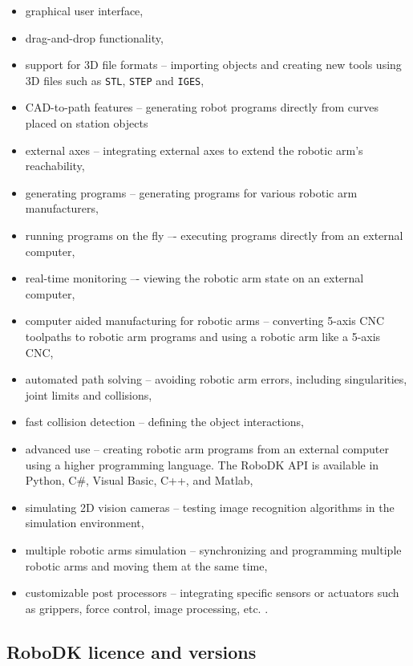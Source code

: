 \begin{itemize}
\item graphical user interface,
\item drag-and-drop functionality, 
\item support for 3D file formats -- importing objects and creating new tools using 3D files such as \texttt{STL}, \texttt{STEP} and \texttt{IGES},
\item CAD-to-path features -- generating robot programs directly from curves placed on station objects 
\item external axes -- integrating external axes to extend the robotic arm’s reachability,
\item generating programs -- generating programs for various robotic arm manufacturers,
\item running programs on the fly –- executing programs directly from an external computer,
\item real-time monitoring –- viewing the robotic arm state on an external computer,
\item computer aided manufacturing for robotic arms -- converting 5-axis CNC toolpaths to robotic arm programs and using a robotic arm like a 5-axis CNC,
\item automated path solving -- avoiding robotic arm errors, including singularities, joint limits and collisions,
\item fast collision detection -- defining the object interactions, 
\item advanced use -- creating robotic arm programs from an external computer using a higher programming language. The RoboDK API is available in Python, C\#, Visual Basic, C++, and Matlab,
\item simulating 2D vision cameras -- testing image recognition algorithms in the simulation environment,
\item multiple robotic arms simulation -- synchronizing and programming multiple robotic arms and moving them at the same time, 
\item customizable post processors -- integrating specific sensors or actuators such as grippers, force control, image processing, etc. \cite{robodkfeatures}.
\end{itemize}

\subsection{RoboDK licence and versions}

